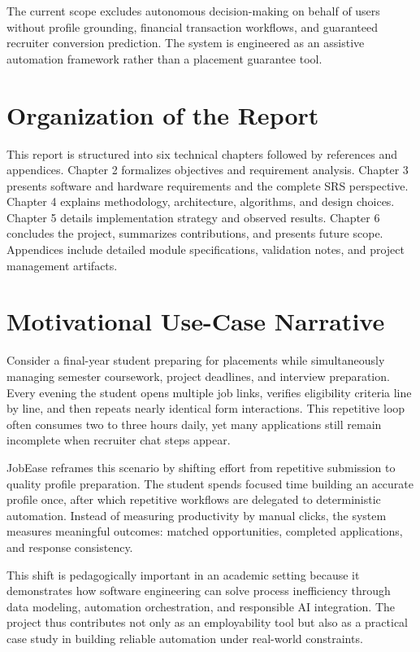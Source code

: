\documentclass[12pt,a4paper,oneside]{report}
\begin{document}
The current scope excludes autonomous decision-making on behalf of users without profile grounding, financial transaction workflows, and guaranteed recruiter conversion prediction. The system is engineered as an assistive automation framework rather than a placement guarantee tool.

\section{Organization of the Report}
This report is structured into six technical chapters followed by references and appendices. Chapter 2 formalizes objectives and requirement analysis. Chapter 3 presents software and hardware requirements and the complete SRS perspective. Chapter 4 explains methodology, architecture, algorithms, and design choices. Chapter 5 details implementation strategy and observed results. Chapter 6 concludes the project, summarizes contributions, and presents future scope. Appendices include detailed module specifications, validation notes, and project management artifacts.

\section{Motivational Use-Case Narrative}
Consider a final-year student preparing for placements while simultaneously managing semester coursework, project deadlines, and interview preparation. Every evening the student opens multiple job links, verifies eligibility criteria line by line, and then repeats nearly identical form interactions. This repetitive loop often consumes two to three hours daily, yet many applications still remain incomplete when recruiter chat steps appear.

JobEase reframes this scenario by shifting effort from repetitive submission to quality profile preparation. The student spends focused time building an accurate profile once, after which repetitive workflows are delegated to deterministic automation. Instead of measuring productivity by manual clicks, the system measures meaningful outcomes: matched opportunities, completed applications, and response consistency.

This shift is pedagogically important in an academic setting because it demonstrates how software engineering can solve process inefficiency through data modeling, automation orchestration, and responsible AI integration. The project thus contributes not only as an employability tool but also as a practical case study in building reliable automation under real-world constraints.
\end{document}
